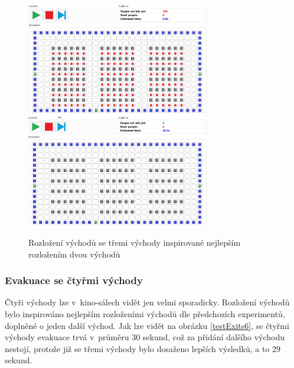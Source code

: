 \documentclass[11pt, titlepage, a4paper]{article}
\begin{document}
        \begin{figure}[H]
            \includegraphics[width=8cm]{ExitDistribution/ExitDistribFive}
            \includegraphics[width=8cm]{ExitDistribution/ExitDistribFiveEnd}
            \caption{Rozložení východů se třemi východy inspirované nejlepším rozložením dvou východů}
            \label{testExits5}
        \end{figure}
        
        \subsubsection{Evakuace se čtyřmi východy}
        Čtyři východy lze v~kino-sálech vidět jen velmi sporadicky. Rozložení východů bylo inspirováno nejlepším rozloženími východů dle předchozích experimentů, doplněné o jeden další východ. Jak lze vidět na obrázku \ref{testExits6}, se čtyřmi východy evakuace trvá v~průměru 30 sekund, což za přidání dalšího východu nestojí, protože již se třemi východy bylo dosaženo lepších výsledků, a to 29 sekund.
        
\end{document}

